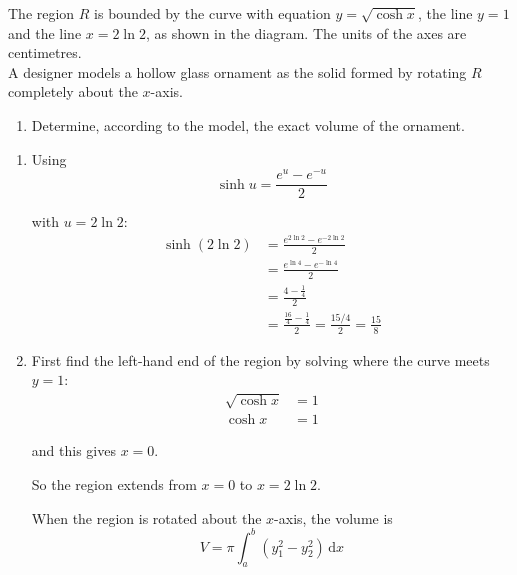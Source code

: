 \documentclass[leqno]{article}
\begin{document}
\begin{enumerate}[
  label=\textbf{\arabic*.},
  leftmargin=*,
  topsep=0pt,
  partopsep=0pt,
  parsep=0pt
]
\begin{figure}[H]
\end{figure}


The region $R$ is bounded by the curve with equation $y=\sqrt{\cosh x}$, the line $y=1$ and the line $x=2\ln 2$, as shown in the diagram. The units of the axes are centimetres. \\

A designer models a hollow glass ornament as the solid formed by rotating $R$ completely about the $x$-axis. \\
\begin{enumerate}[label=\textbf{(\alph*)}, resume]
  \item Determine, according to the model, the exact volume of the ornament.  \\
\end{enumerate}

\vspace*{10pt}

\begin{djsSolution}
\begin{enumerate}[label=\textbf{(\alph*)}]
  \item Using
  \[
  \sinh u=\frac{e^u-e^{-u}}{2}
  \]

  with $u=2\ln 2$:
  \begin{align*}
  \sinh(2\ln 2)
  &=\frac{e^{2\ln 2}-e^{-2\ln 2}}{2} \\
  &=\frac{e^{\ln 4}-e^{-\ln 4}}{2} \\
  &=\frac{4-\frac14}{2} \\
  &=\frac{\frac{16}{4}-\frac14}{2}
   =\frac{15/4}{2}
   =\frac{15}{8}
  \end{align*}

  \item First find the left-hand end of the region by solving where the curve meets $y=1$:
  \begin{align*}
  \sqrt{\cosh x} &= 1 \\
  \cosh x &= 1
  \end{align*}

  and this gives $x=0$.

  So the region extends from $x=0$ to $x=2\ln 2$.

  When the region is rotated about the $x$-axis, the volume is
  \[
  V=\pi\int_a^b \left(y_1^2-y_2^2\right)\,\mathrm{d}x
  \]


\end{enumerate}
\end{djsSolution}
\end{enumerate}
\end{document}
